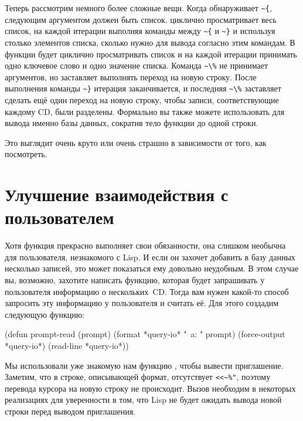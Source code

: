 Теперь рассмотрим немного более сложные вещи. Когда  обнаруживает
\lstinline!~{!, следующим аргументом должен быть список.  циклично
  просматривает весь список, на каждой итерации выполняя команды между \lstinline!~{! и
    \lstinline!~}! и используя столько элементов списка, сколько нужно для вывода согласно
  этим командам. В функции   будет циклично просматривать
  список и на каждой итерации принимать одно ключевое слово и одно значение
  списка. Команда \lstinline!~\%! не принимает аргументов, но заставляет 
  выполнять переход на новую строку. После выполнения команды \lstinline!~}! итерация
заканчивается, и последняя \lstinline!~\%! заставляет  сделать ещё один
переход на новую строку, чтобы записи, соответствующие каждому CD, были разделены.
Формально вы также можете использовать  для вывода именно базы данных,
сократив тело функции  до одной строки.


Это выглядит очень круто или очень страшно в зависимости от того, как посмотреть.

\section{Улучшение взаимодействия с пользователем}

Хотя функция  прекрасно выполняет свои обязанности, она слишком необычна
для пользователя, незнакомого с Lisp. И если он захочет добавить в базу данных несколько
записей, это может показаться ему довольно неудобным. В этом случае вы, возможно, захотите
написать функцию, которая будет запрашивать у пользователя информацию о нескольких~CD.
Тогда вам нужен какой-то способ запросить эту информацию у пользователя и считать её. Для
этого создадим следующую функцию:

\begin{myverb}
(defun prompt-read (prompt)
 (format *query-io* "~a: " prompt)
 (force-output *query-io*)
 (read-line *query-io*))
\end{myverb}

Мы использовали уже знакомую нам функцию , чтобы вывести
приглашение. Заметим, что в строке, описывающей формат, отсутствует \lstinline{<<~%"},
поэтому перевода курсора на новую строку не происходит. Вызов 
необходим в некоторых реализациях для уверенности в том, что Lisp не будет ожидать вывода
новой строки перед выводом приглашения.

